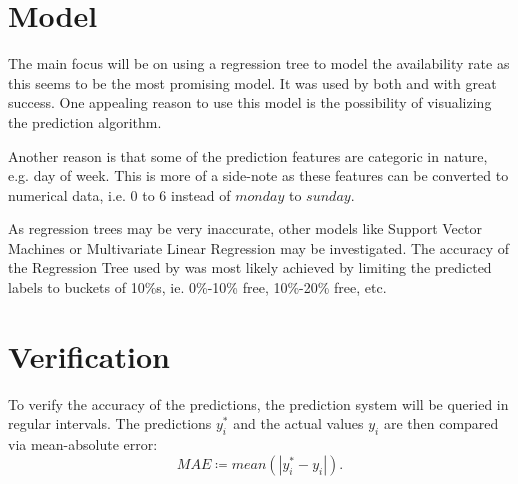 \documentclass[journal,10pt]{IEEEtran}
\newcommand{\defeq}{\coloneqq}
\begin{document}
\section{Model}
The main focus will be on using a regression tree to model the availability rate as this seems to be the most promising model. It was used by both \cite{parkendd} and \cite{Zheng2015} with great success. One appealing reason to use this model is the possibility of visualizing the prediction algorithm.

Another reason is that some of the prediction features are categoric in nature, e.g. day of week. This is more of a side-note as these features can be converted to numerical data, i.e. \(0\) to \(6\) instead of \(monday\) to \(sunday\).

As regression trees may be very inaccurate, other models like Support Vector Machines or Multivariate Linear Regression may be investigated. The accuracy of the Regression Tree used by \cite{parkendd} was most likely achieved by limiting the predicted labels to buckets of 10\%s, ie. 0\%-10\% free, 10\%-20\% free, etc. 

\section{Verification}
To verify the accuracy of the predictions, the prediction system will be queried in regular intervals. The predictions \(y_i^*\) and the actual values \(y_i\) are then compared via mean-absolute error:
\[
MAE \defeq mean(| y_i^* - y_i |)\text{.}
\]

  

\end{document}
